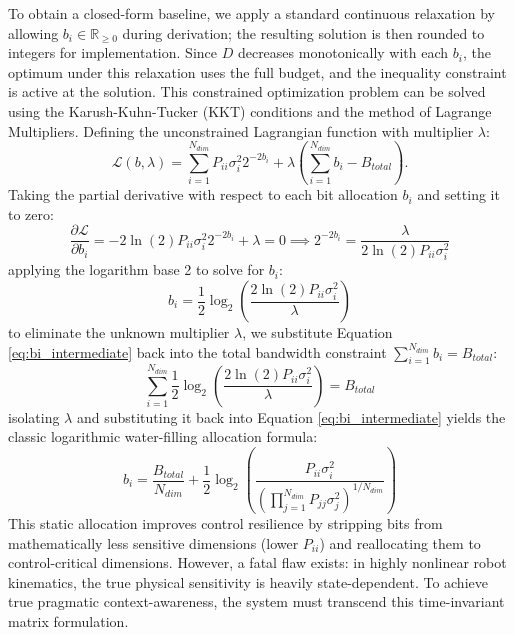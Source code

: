 To obtain a closed-form baseline, we apply a standard continuous relaxation by allowing $b_i \in \mathbb{R}_{\ge 0}$ during derivation; the resulting solution is then rounded to integers for implementation. Since $D$ decreases monotonically with each $b_i$, the optimum under this relaxation uses the full budget, and the inequality constraint is active at the solution. This constrained optimization problem can be solved using the Karush-Kuhn-Tucker (KKT) conditions and the method of Lagrange Multipliers. Defining the unconstrained Lagrangian function with multiplier $\lambda$:
\begin{equation}
    \mathcal{L}(b, \lambda) = \sum_{i=1}^{N_{dim}} P_{ii} \sigma_i^2 2^{-2b_i} + \lambda \left( \sum_{i=1}^{N_{dim}} b_i - B_{total} \right).
\end{equation}
Taking the partial derivative with respect to each bit allocation $b_i$ and setting it to zero:
\begin{equation} \label{eq:partial_derivative}
    \frac{\partial \mathcal{L}}{\partial b_i} = -2 \ln(2) P_{ii} \sigma_i^2 2^{-2b_i} + \lambda = 0 \implies 2^{-2b_i} = \frac{\lambda}{2 \ln(2) P_{ii} \sigma_i^2}
\end{equation}
applying the logarithm base 2 to solve for $b_i$:
\begin{equation} \label{eq:bi_intermediate}
    b_i = \frac{1}{2} \log_2 \left( \frac{2 \ln(2) P_{ii} \sigma_i^2}{\lambda} \right)
\end{equation}
to eliminate the unknown multiplier $\lambda$, we substitute Equation \ref{eq:bi_intermediate} back into the total bandwidth constraint $\sum_{i=1}^{N_{dim}} b_i = B_{total}$:
\begin{equation}
    \sum_{i=1}^{N_{dim}} \frac{1}{2} \log_2 \left( \frac{2 \ln(2) P_{ii} \sigma_i^2}{\lambda} \right) = B_{total}
\end{equation}
isolating $\lambda$ and substituting it back into Equation \ref{eq:bi_intermediate} yields the classic logarithmic water-filling allocation formula:
\begin{equation} \label{eq:lqr_waterfilling}
    b_i = \frac{B_{total}}{N_{dim}} + \frac{1}{2} \log_2 \left( \frac{P_{ii} \sigma_i^2}{\left( \prod_{j=1}^{N_{dim}} P_{jj} \sigma_j^2 \right)^{1/N_{dim}}} \right)
\end{equation}
This static allocation improves control resilience by stripping bits from mathematically less sensitive dimensions (lower $P_{ii}$) and reallocating them to control-critical dimensions. However, a fatal flaw exists: in highly nonlinear robot kinematics, the true physical sensitivity is heavily state-dependent. To achieve true pragmatic context-awareness, the system must transcend this time-invariant matrix formulation.

